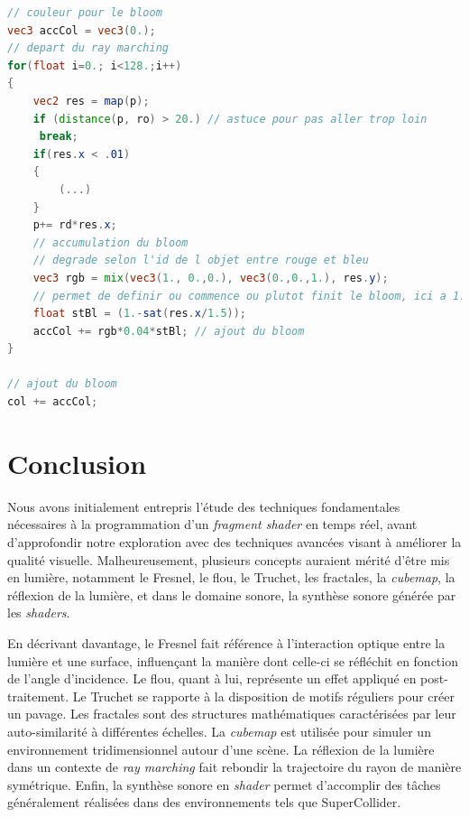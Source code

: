 \begin{minipage}{\linewidth}
\begin{lstlisting}[language=GLSL, caption=Glow 3D,captionpos=b,frame=single] 
// couleur pour le bloom
vec3 accCol = vec3(0.);
// depart du ray marching
for(float i=0.; i<128.;i++)
{
    vec2 res = map(p);
    if (distance(p, ro) > 20.) // astuce pour pas aller trop loin
     break;
    if(res.x < .01)
    {
        (...)
    }
    p+= rd*res.x;
    // accumulation du bloom
    // degrade selon l'id de l objet entre rouge et bleu
    vec3 rgb = mix(vec3(1., 0.,0.), vec3(0.,0.,1.), res.y);
    // permet de definir ou commence ou plutot finit le bloom, ici a 1.5 de la surface
    float stBl = (1.-sat(res.x/1.5));
    accCol += rgb*0.04*stBl; // ajout du bloom
}

// ajout du bloom
col += accCol;
\end{lstlisting}
\end{minipage}



\newpage
\section{Conclusion}

Nous avons initialement entrepris l'étude des techniques fondamentales nécessaires à la programmation d'un \textit{fragment shader} en temps réel, avant d'approfondir notre exploration avec des techniques avancées visant à améliorer la qualité visuelle. Malheureusement, plusieurs concepts auraient mérité d'être mis en lumière, notamment le Fresnel, le flou, le Truchet, les fractales, la \textit{cubemap}, la réflexion de la lumière, et dans le domaine sonore, la synthèse sonore générée par les \textit{shaders}. 

En décrivant davantage, le Fresnel fait référence à l'interaction optique entre la lumière et une surface, influençant la manière dont celle-ci se réfléchit en fonction de l'angle d'incidence. Le flou, quant à lui, représente un effet appliqué en post-traitement. Le Truchet se rapporte à la disposition de motifs réguliers pour créer un pavage. Les fractales sont des structures mathématiques caractérisées par leur auto-similarité à différentes échelles. La \textit{cubemap} est utilisée pour simuler un environnement tridimensionnel autour d'une scène. La réflexion de la lumière dans un contexte de \textit{ray marching} fait rebondir la trajectoire du rayon de manière symétrique. Enfin, la synthèse sonore en \textit{shader} permet d'accomplir des tâches généralement réalisées dans des environnements tels que SuperCollider.

